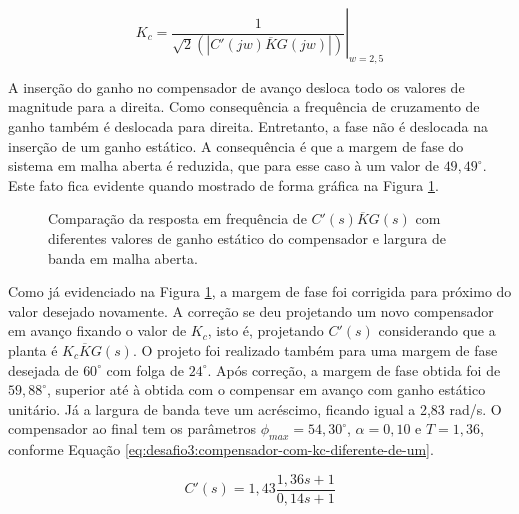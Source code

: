\begin{equation}
    \label{eq:desafio3:calculo-de-kc}
    K_{c} = \left. \frac{1}{\sqrt{2}(|{C}'(jw)\overline{K}G(jw)|)} \right |_{w = 2,5}
\end{equation}

A inserção do ganho no compensador de avanço desloca todo os valores de
magnitude para a direita. Como consequência a frequência de cruzamento de ganho
também é deslocada para direita. Entretanto, a fase não é deslocada na inserção
de um ganho estático. A consequência é que a margem de fase do sistema em
malha aberta é reduzida, que para esse caso à um valor de
$49,49^{\circ}$. Este fato fica evidente quando mostrado de forma gráfica na
Figura \ref{fig:desafio-3:questao-5-6-malha-aberta}.

\begin{figure}[ht!]
    \caption{Comparação da resposta em frequência de ${C}'(s)\overline{K}G(s)$ com
    diferentes valores de ganho estático do compensador e largura de banda em
    malha aberta.}
    \vspace{-10pt}
    \hspace{-30pt}
    \label{fig:desafio-3:questao-5-6-malha-aberta}
    \begin{minipage}{\linewidth}
        
    \end{minipage}
\end{figure}

Como já evidenciado na Figura \ref{fig:desafio-3:questao-5-6-malha-aberta}, a
margem de fase foi corrigida para próximo do valor desejado novamente. A
correção se deu projetando um novo compensador em avanço fixando o valor de
$K_{c}$, isto é, projetando ${C}'(s)$ considerando que a planta é
$K_{c}\overline{K}G(s)$. O projeto foi realizado também para uma margem de fase
desejada de $60^{\circ}$ com folga de $24^{\circ}$. Após correção, a margem de
fase obtida foi de $59,88^{\circ}$, superior até à obtida com o compensar em
avanço com ganho estático unitário. Já a largura de banda teve um acréscimo,
ficando igual a 2,83 rad/s. O compensador ao final tem os parâmetros $\phi_{max}
= 54,30^{\circ}$, $\alpha = 0,10$ e $T = 1,36$, conforme Equação
\ref{eq:desafio3:compensador-com-kc-diferente-de-um}.

\begin{equation}
    \label{eq:desafio3:compensador-com-kc-diferente-de-um}
    C'(s) = 1,43\frac{1,36s + 1}{0,14s + 1}
\end{equation}

